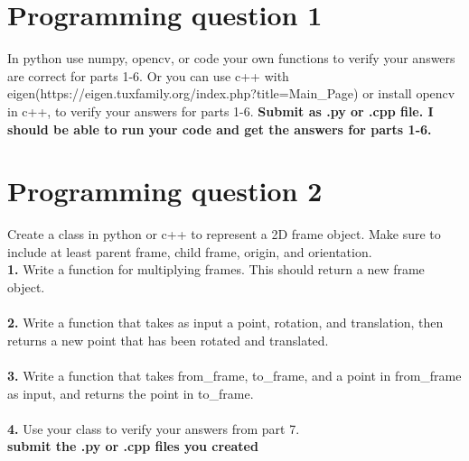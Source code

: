 \documentclass{article}
\begin{document}
\section{Programming question 1}
In python use numpy, opencv, or code your own functions to verify your answers are correct for parts 1-6.
Or you can use c++ with \\eigen(https://eigen.tuxfamily.org/index.php?title=Main\_Page) or install opencv in c++, to verify your answers for parts 1-6. \textbf{Submit as .py or .cpp file. I should be able to run your code and get the answers for parts 1-6.}

\section{Programming question 2}
Create a class in python or c++ to represent a 2D frame object. Make sure to include at least parent frame, child frame, origin, and orientation.\\
\textbf{1. } Write a function for multiplying frames. This should return a new frame object.\\\\
\textbf{2. } Write a function that takes as input a point, rotation, and translation, then returns a new point that has been rotated and translated.\\\\
\textbf{3. } Write a function that takes from\_frame, to\_frame, and a point in from\_frame as input, and returns the point in to\_frame.\\\\
\textbf{4. }  Use your class to verify your answers from part 7.\\
\textbf{submit the .py or .cpp files you created}
\end{document}
